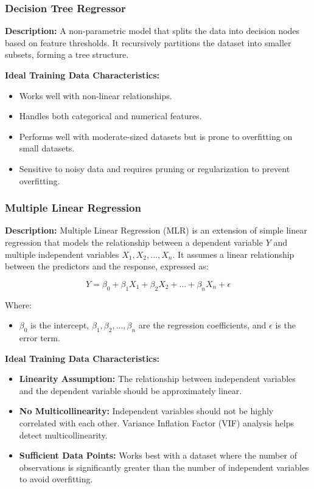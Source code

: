 \subsubsection{Decision Tree Regressor}
\textbf{Description:} A non-parametric model that splits the data into decision nodes based on feature thresholds. It recursively partitions the dataset into smaller subsets, forming a tree structure.

\textbf{Ideal Training Data Characteristics:}
\begin{itemize}
    \item Works well with non-linear relationships.
    \item Handles both categorical and numerical features.
    \item Performs well with moderate-sized datasets but is prone to overfitting on small datasets.
    \item Sensitive to noisy data and requires pruning or regularization to prevent overfitting.
\end{itemize}

\subsubsection{Multiple Linear Regression}
\textbf{Description:} Multiple Linear Regression (MLR) is an extension of simple linear regression that models the relationship between a dependent variable \( Y \) and multiple independent variables \( X_1, X_2, ..., X_n \). It assumes a linear relationship between the predictors and the response, expressed as:

\begin{equation}
    Y = \beta_0 + \beta_1 X_1 + \beta_2 X_2 + ... + \beta_n X_n + \epsilon
\end{equation}

Where:
\begin{itemize}
    \item \( \beta_0 \) is the intercept, \( \beta_1, \beta_2, ..., \beta_n \) are the regression coefficients, and \( \epsilon \) is the error term.
\end{itemize}

\textbf{Ideal Training Data Characteristics:}
\begin{itemize}
    \item \textbf{Linearity Assumption:} The relationship between independent variables and the dependent variable should be approximately linear.
    \item \textbf{No Multicollinearity:} Independent variables should not be highly correlated with each other. Variance Inflation Factor (VIF) analysis helps detect multicollinearity.
    \item \textbf{Sufficient Data Points:} Works best with a dataset where the number of observations is significantly greater than the number of independent variables to avoid overfitting.
\end{itemize}

